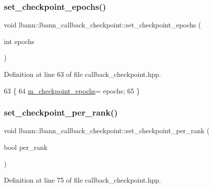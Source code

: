 \subsubsection{\texorpdfstring{set\+\_\+checkpoint\+\_\+epochs()}{set\_checkpoint\_epochs()}}
{\footnotesize\ttfamily void lbann\+::lbann\+\_\+callback\+\_\+checkpoint\+::set\+\_\+checkpoint\+\_\+epochs (\begin{DoxyParamCaption}\item[{int}]{epochs }\end{DoxyParamCaption})\hspace{0.3cm}{\ttfamily [inline]}}



Definition at line 63 of file callback\+\_\+checkpoint.\+hpp.


\begin{DoxyCode}
63                                                \{
64     \hyperlink{classlbann_1_1lbann__callback__checkpoint_ad6f4399effadedb26e33fc39a3c6915e}{m\_checkpoint\_epochs}= epochs;
65   \}
\end{DoxyCode}
\mbox{\label{classlbann_1_1lbann__callback__checkpoint_ac3a0bb250a679b28924910c0dc617809}} 
\subsubsection{\texorpdfstring{set\+\_\+checkpoint\+\_\+per\+\_\+rank()}{set\_checkpoint\_per\_rank()}}
{\footnotesize\ttfamily void lbann\+::lbann\+\_\+callback\+\_\+checkpoint\+::set\+\_\+checkpoint\+\_\+per\+\_\+rank (\begin{DoxyParamCaption}\item[{bool}]{per\+\_\+rank }\end{DoxyParamCaption})\hspace{0.3cm}{\ttfamily [inline]}}



Definition at line 75 of file callback\+\_\+checkpoint.\+hpp.


